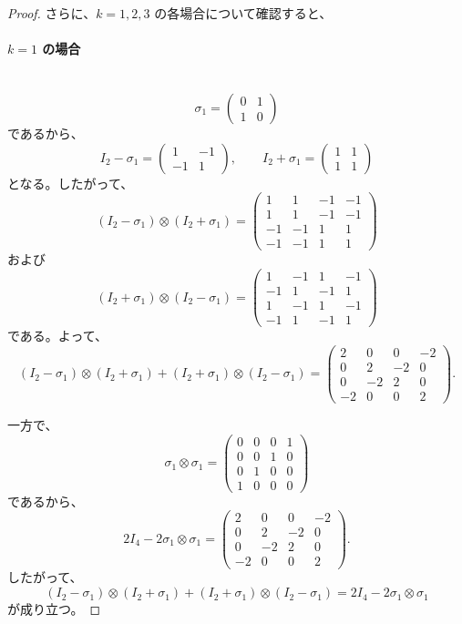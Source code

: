 \documentclass[dvipdfmx,a4paper]{jsarticle}
\theoremstyle{mystyle}
\begin{document}
\begin{proof}
\medskip
\noindent
さらに、$k=1,2,3$ の各場合について確認すると、

\paragraph{\textbf{$k=1$ の場合}} \ \\
\[
\sigma_1=
\begin{pmatrix}
0 & 1\\
1 & 0
\end{pmatrix}
\]
であるから、
\[
I_2-\sigma_1=
\begin{pmatrix}
1 & -1\\
-1 & 1
\end{pmatrix},
\qquad
I_2+\sigma_1=
\begin{pmatrix}
1 & 1\\
1 & 1
\end{pmatrix}
\]
となる。したがって、
\[
(I_2-\sigma_1)\otimes(I_2+\sigma_1)
=
\begin{pmatrix}
1 & 1 & -1 & -1\\
1 & 1 & -1 & -1\\
-1 & -1 & 1 & 1\\
-1 & -1 & 1 & 1
\end{pmatrix}
\]
および
\[
(I_2+\sigma_1)\otimes(I_2-\sigma_1)
=
\begin{pmatrix}
1 & -1 & 1 & -1\\
-1 & 1 & -1 & 1\\
1 & -1 & 1 & -1\\
-1 & 1 & -1 & 1
\end{pmatrix}
\]
である。よって、
\[
(I_2-\sigma_1)\otimes(I_2+\sigma_1)
+(I_2+\sigma_1)\otimes(I_2-\sigma_1)
=
\begin{pmatrix}
2 & 0 & 0 & -2\\
0 & 2 & -2 & 0\\
0 & -2 & 2 & 0\\
-2 & 0 & 0 & 2
\end{pmatrix}.
\]

一方で、
\[
\sigma_1\otimes\sigma_1
=
\begin{pmatrix}
0 & 0 & 0 & 1\\
0 & 0 & 1 & 0\\
0 & 1 & 0 & 0\\
1 & 0 & 0 & 0
\end{pmatrix}
\]
であるから、
\[
2I_4-2\sigma_1\otimes\sigma_1
=
\begin{pmatrix}
2 & 0 & 0 & -2\\
0 & 2 & -2 & 0\\
0 & -2 & 2 & 0\\
-2 & 0 & 0 & 2
\end{pmatrix}.
\]
したがって、
\[
(I_2-\sigma_1)\otimes(I_2+\sigma_1)
+(I_2+\sigma_1)\otimes(I_2-\sigma_1)
=
2I_4-2\sigma_1\otimes\sigma_1
\]
が成り立つ。


\end{proof}
\end{document}
